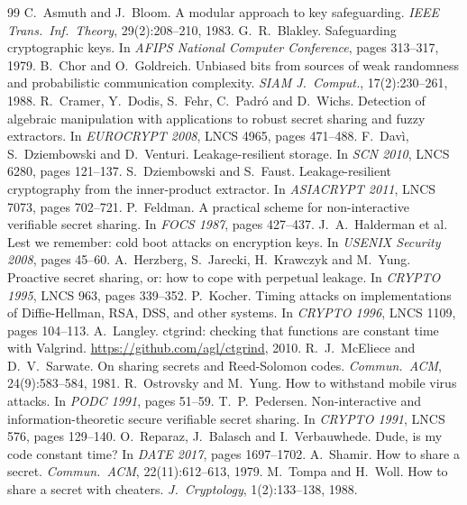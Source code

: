 \documentclass[10.5pt,a4paper]{article}
\theoremstyle{plain}
\theoremstyle{definition}
\begin{document}
\small
\begin{thebibliography}{99}\setlength{\itemsep}{1pt}
 C.~Asmuth and J.~Bloom. A modular approach to key safeguarding. \emph{IEEE Trans.\ Inf.\ Theory}, 29(2):208--210, 1983.
 G.~R.~Blakley. Safeguarding cryptographic keys. In \emph{AFIPS National Computer Conference}, pages 313--317, 1979.
 B.~Chor and O.~Goldreich. Unbiased bits from sources of weak randomness and probabilistic communication complexity. \emph{SIAM J.\ Comput.}, 17(2):230--261, 1988.
 R.~Cramer, Y.~Dodis, S.~Fehr, C.~Padr\'o and D.~Wichs. Detection of algebraic manipulation with applications to robust secret sharing and fuzzy extractors. In \emph{EUROCRYPT 2008}, LNCS 4965, pages 471--488.
 F.~Dav\`i, S.~Dziembowski and D.~Venturi. Leakage-resilient storage. In \emph{SCN 2010}, LNCS 6280, pages 121--137.
 S.~Dziembowski and S.~Faust. Leakage-resilient cryptography from the inner-product extractor. In \emph{ASIACRYPT 2011}, LNCS 7073, pages 702--721.
 P.~Feldman. A practical scheme for non-interactive verifiable secret sharing. In \emph{FOCS 1987}, pages 427--437.
 J.~A.~Halderman et al. Lest we remember: cold boot attacks on encryption keys. In \emph{USENIX Security 2008}, pages 45--60.
 A.~Herzberg, S.~Jarecki, H.~Krawczyk and M.~Yung. Proactive secret sharing, or: how to cope with perpetual leakage. In \emph{CRYPTO 1995}, LNCS 963, pages 339--352.
 P.~Kocher. Timing attacks on implementations of Diffie-Hellman, RSA, DSS, and other systems. In \emph{CRYPTO 1996}, LNCS 1109, pages 104--113.
 A.~Langley. ctgrind: checking that functions are constant time with Valgrind. \url{https://github.com/agl/ctgrind}, 2010.
 R.~J.~McEliece and D.~V.~Sarwate. On sharing secrets and Reed-Solomon codes. \emph{Commun.\ ACM}, 24(9):583--584, 1981.
 R.~Ostrovsky and M.~Yung. How to withstand mobile virus attacks. In \emph{PODC 1991}, pages 51--59.
 T.~P.~Pedersen. Non-interactive and information-theoretic secure verifiable secret sharing. In \emph{CRYPTO 1991}, LNCS 576, pages 129--140.
 O.~Reparaz, J.~Balasch and I.~Verbauwhede. Dude, is my code constant time? In \emph{DATE 2017}, pages 1697--1702.
 A.~Shamir. How to share a secret. \emph{Commun.\ ACM}, 22(11):612--613, 1979.
 M.~Tompa and H.~Woll. How to share a secret with cheaters. \emph{J.\ Cryptology}, 1(2):133--138, 1988.
\end{thebibliography}
\end{document}
